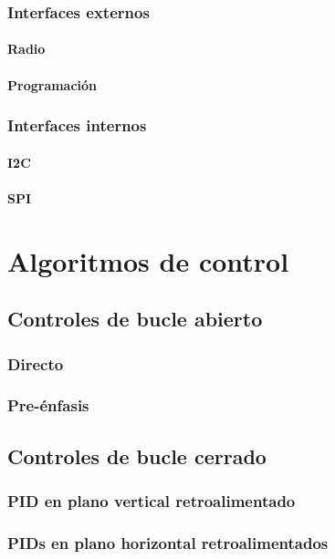 \documentclass[10pt]{article}
\begin{document}
		\subsubsection{Interfaces externos}
			\paragraph{Radio }
			\paragraph{Programación}
		\subsubsection{Interfaces internos}
			\paragraph{I2C}
			\paragraph{SPI}
			
\section{Algoritmos de control}
	\subsection{Controles de bucle abierto}
		\subsubsection{Directo}
		\subsubsection{Pre-énfasis}
	\subsection{Controles de bucle cerrado}
		\subsubsection{PID en plano vertical retroalimentado}
		\subsubsection{PIDs en plano horizontal retroalimentados}
		
\end{document}
